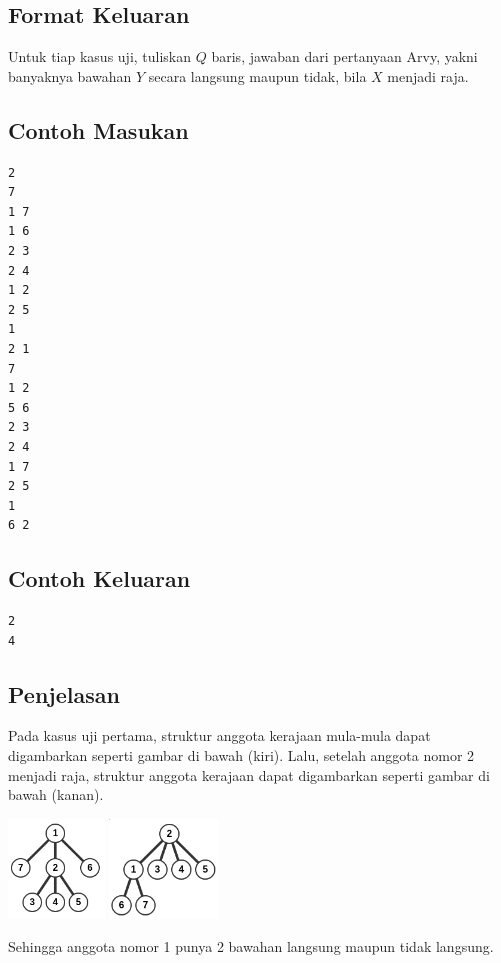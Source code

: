 \documentclass{article}
\begin{document}
\subsection*{Format Keluaran}

Untuk tiap kasus uji, tuliskan $Q$ baris, jawaban dari pertanyaan Arvy, yakni banyaknya bawahan $Y$ secara langsung maupun tidak, bila $X$ menjadi raja.

\pagebreak

\begin{multicols}{2}
\subsection*{Contoh Masukan}
\begin{lstlisting}
2
7
1 7
1 6
2 3
2 4
1 2
2 5
1
2 1
7
1 2
5 6
2 3
2 4
1 7
2 5
1
6 2
\end{lstlisting}
\columnbreak
\subsection*{Contoh Keluaran}
\begin{lstlisting}
2
4
\end{lstlisting}
\vfill
\null
\end{multicols}

\subsection*{Penjelasan}
Pada kasus uji pertama, struktur anggota kerajaan mula-mula dapat digambarkan seperti gambar di bawah (kiri). Lalu, setelah anggota nomor 2 menjadi raja, struktur anggota kerajaan dapat digambarkan seperti gambar di bawah (kanan).

\includegraphics[height=100px]{sample-1-1}
\includegraphics[height=100px]{sample-1-2}

Sehingga anggota nomor 1 punya 2 bawahan langsung maupun tidak langsung.
\end{document}
